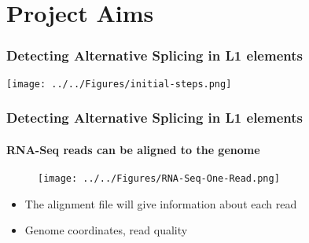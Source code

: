 \documentclass{beamer}
\begin{document}
		
			
				
			
			
		
		\section{Project Aims}
		
%			
%			
%			
%			
		\begin{frame} %
			\frametitle{Detecting Alternative Splicing in L1 elements}
			
			\texttt{[image: ../../Figures/initial-steps.png]}
		\end{frame}
		
		\begin{frame} %
			\frametitle{Detecting Alternative Splicing in L1 elements}
			\framesubtitle{RNA-Seq reads can be aligned to the genome}
			
			\vfill
			\begin{figure}
				\centering
				\texttt{[image: ../../Figures/RNA-Seq-One-Read.png]}
			\end{figure}
			\vfill
			\begin{itemize}
				\item The alignment file will give information about each read
				\item Genome coordinates, read quality
			\end{itemize}
		\end{frame}
			
\end{document}
